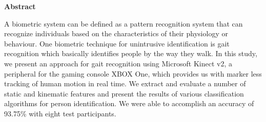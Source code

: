 \begin{center}
\begin{huge}
\bfseries{Abstract}
\end{huge}
\end{center}

\noindent A biometric system can be defined as a pattern recognition system that can recognize individuals based on the characteristics of their physiology or behaviour. One biometric technique for unintrusive identification is gait recognition which basically identifies people by the way they walk. In this study, we present an approach for gait recognition using Microsoft Kinect v2, a peripheral for the gaming console XBOX One, which provides us with marker less tracking of human motion in real time. We extract and evaluate a number of static and kinematic features and present the results of various classification algorithms for person identification. We were able to accomplish an accuracy of 93.75\% with eight test participants.
\pagebreak
